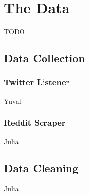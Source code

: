 \section{The Data}
TODO
\subsection{Data Collection}

\subsubsection{Twitter Listener}
Yuval

\subsubsection{Reddit Scraper}
Julia

\subsection{Data Cleaning}
Julia
